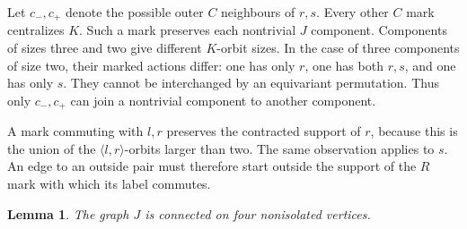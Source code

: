 \documentclass[11pt,a4paper]{article}
\newtheorem{lemma}{Lemma}
\newcommand{\gen}[1]{\langle#1\rangle}
\begin{document}
Let $c_-,c_+$ denote the possible outer $C$ neighbours of $r,s$.
Every other $C$ mark centralizes $K$. Such a mark preserves each
nontrivial $J$ component. Components of sizes three and two give
different $K$-orbit sizes. In the case of three components of
size two, their marked actions differ: one has only $r$, one
has both $r,s$, and one has only $s$. They cannot be interchanged
by an equivariant permutation. Thus only $c_-,c_+$ can join
a nontrivial component to another component.

A mark commuting with $l,r$ preserves the contracted support of
$r$, because this is the union of the $\gen{l,r}$-orbits larger
than two. The same observation applies to $s$. An edge to an
outside pair must therefore start outside the support of the
$R$ mark with which its label commutes.

\begin{lemma}\label{four}
The graph $J$ is connected on four nonisolated vertices.
\end{lemma}
\end{document}

